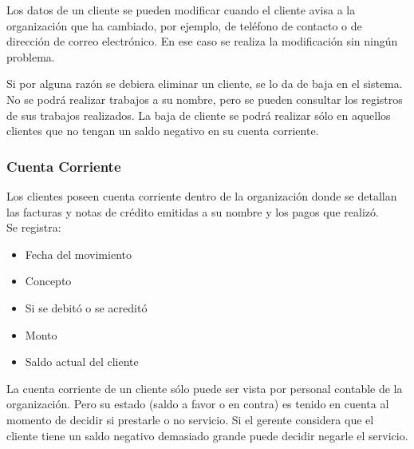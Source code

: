 \documentclass[12pt]{extarticle}
\begin{document}
\begin{spacing}{1.2}
    Los datos de un cliente se pueden modificar cuando el cliente avisa a la organización que ha cambiado, por ejemplo, de teléfono de contacto o de dirección de correo electrónico. En ese caso se realiza la modificación sin ningún problema.

    Si por alguna razón se debiera eliminar un cliente, se lo da de baja en el sistema. No se podrá realizar trabajos a su nombre, pero se pueden consultar los registros de sus trabajos realizados. La baja de cliente se podrá realizar sólo en aquellos clientes que no tengan un saldo negativo en su cuenta corriente.
    
    \subsubsection{Cuenta Corriente}
        Los clientes poseen cuenta corriente dentro de la organización donde se detallan las facturas y notas de crédito emitidas a su nombre y los pagos que realizó.\\
        Se registra:
        \begin{itemize}
            \item Fecha del movimiento
            \item Concepto
            \item Si se debitó o se acreditó
            \item Monto
            \item Saldo actual del cliente
        \end{itemize}

        La cuenta corriente de un cliente sólo puede ser vista por personal contable de la organización. Pero su estado (saldo a favor o en contra) es tenido en cuenta al momento de decidir si prestarle o no servicio. Si el gerente considera que el cliente tiene un saldo negativo demasiado grande puede decidir negarle el servicio.


    \pagebreak

\end{spacing}
\end{document}
